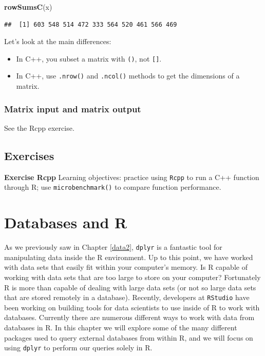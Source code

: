 \documentclass[
]{krantz}
\newenvironment{Shaded}{\begin{snugshade}}{\end{snugshade}}
\newcommand{\KeywordTok}[1]{\textcolor[rgb]{0.13,0.29,0.53}{\textbf{#1}}}
\newcommand{\NormalTok}[1]{#1}
\providecommand{\tightlist}{%
  \setlength{\itemsep}{0pt}\setlength{\parskip}{0pt}}
\begin{document}
\begin{Shaded}
\begin{Highlighting}[]
\KeywordTok{rowSumsC}\NormalTok{(x)}
\end{Highlighting}
\end{Shaded}

\begin{verbatim}
##  [1] 603 548 514 472 333 564 520 461 566 469
\end{verbatim}

Let's look at the main differences:

\begin{itemize}
\tightlist
\item
  In C++, you subset a matrix with \texttt{()}, not \texttt{{[}{]}}.
\item
  In C++, use \texttt{.nrow()} and \texttt{.ncol()} methods to get the dimensions of a matrix.
\end{itemize}

\hypertarget{matrix-input-and-matrix-output}{%
\subsection{Matrix input and matrix output}\label{matrix-input-and-matrix-output}}

See the Rcpp exercise.

\hypertarget{exCPP}{%
\section{Exercises}\label{exCPP}}

\textbf{Exercise Rcpp} Learning objectives: practice using \texttt{Rcpp} to run a C++ function through R; use \texttt{microbenchmark()} to compare function performance.

\hypertarget{databases-and-r}{%
\chapter{Databases and R}\label{databases-and-r}}

As we previously saw in Chapter \ref{data2}, \texttt{dplyr} is a fantastic tool for manipulating data inside the R environment. Up to this point, we have worked with data sets that easily fit within your computer's memory. Is R capable of working with data sets that are too large to store on your computer? Fortunately R is more than capable of dealing with large data sets (or not so large data sets that are stored remotely in a database). Recently, developers at \texttt{RStudio} have been working on building tools for data scientists to use inside of R to work with databases. Currently there are numerous different ways to work with data from databases in R. In this chapter we will explore some of the many different packages used to query external databases from within R, and we will focus on using \texttt{dplyr} to perform our queries solely in R.
\end{document}
